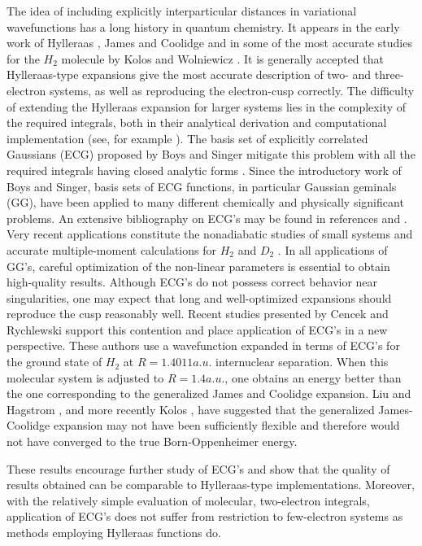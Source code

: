 The idea of including explicitly interparticular distances in variational
wavefunctions has a long history in quantum chemistry. It appears in the
early work of Hylleraas \cite{hyl29}, James and Coolidge \cite{jam33} and in
some of the most accurate studies for the $H_2$ molecule by Kolos and
Wolniewicz \cite{kol65}. It is generally accepted that Hylleraas-type
expansions give the most accurate description of two- and three-electron
systems, as well as reproducing the electron-cusp correctly. The difficulty
of extending the Hylleraas expansion for larger systems lies in the
complexity of the required integrals, both in their analytical derivation
and computational implementation (see, for example \cite{fromm1, king1}).
The basis set of explicitly correlated Gaussians (ECG) proposed by Boys \cite
{boy60} and Singer \cite{sin60} mitigate this problem with all the required
integrals having closed analytic forms \cite{les64, koz91, koz92a}. Since
the introductory work of Boys and Singer, basis sets of ECG functions, in
particular Gaussian geminals (GG), have been applied to many different
chemically and physically significant problems. An extensive bibliography on
ECG's may be found in references \cite{sza83} and \cite{koz91}. Very recent
applications constitute the nonadiabatic studies of small systems \cite
{koz93a, koz93} and accurate multiple-moment calculations for $H_2$ and $D_2$
\cite{kom93}. In all applications of GG's, careful optimization of the
non-linear parameters is essential to obtain high-quality results. Although
ECG's do not possess correct behavior near singularities, one may expect
that long and well-optimized expansions should reproduce the cusp reasonably
well. Recent studies presented by Cencek and Rychlewski \cite{cen93} support
this contention and place application of ECG's in a new perspective. These
authors use a wavefunction expanded in terms of ECG's for the ground state
of $H_2$ at $R=1.4011a.u.$ internuclear separation. When this molecular
system is adjusted to $R=1.4a.u.$, one obtains an energy better than the one
corresponding to the generalized James and Coolidge expansion. Liu and
Hagstrom \cite{liu93}, and more recently Kolos \cite{kol94}, have suggested
that the generalized James-Coolidge expansion may not have been sufficiently
flexible and therefore would not have converged to the true Born-Oppenheimer
energy.

These results encourage further study of ECG's and show that the quality of
results obtained can be comparable to Hylleraas-type implementations.
Moreover, with the relatively simple evaluation of molecular, two-electron
integrals, application of ECG's does not suffer from restriction to
few-electron systems as methods employing Hylleraas functions do.

